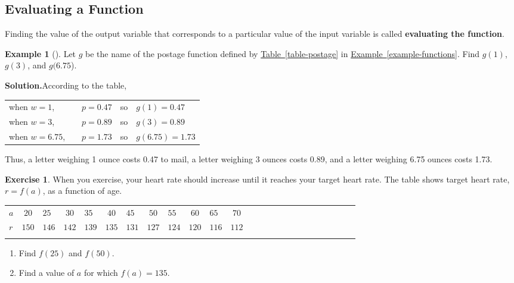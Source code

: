 \documentclass[10pt,]{book}
\newcommand{\terminology}[1]{\textbf{#1}}
\theoremstyle{plain}
\theoremstyle{definition}
\theoremstyle{definition}
\newtheorem{example}[theorem]{Example}
\theoremstyle{definition}
\theoremstyle{definition}
\newtheorem{exercise}[theorem]{Exercise}
\numberwithin{equation}{part}
\newcommand{\hrulethin}  {\noalign{\hrule height 0.04em}}
\newcommand{\hrulethick} {\noalign{\hrule height 0.11em}}
\begin{document}
\subsection[{Evaluating a Function}]{Evaluating a Function}\label{subsection-12}
Finding the value of the output variable that corresponds to a particular value of the input variable is called \terminology{evaluating the function}.%
\begin{example}[]\label{example-postage2}
Let \(g\) be the name of the postage function defined by \hyperref[table-postage]{Table~\ref{table-postage}}  in \hyperref[example-functions]{Example~\ref{example-functions}}. Find \(g(1)\), \(g(3)\), and \(g(6.75\)).%
\par\medskip\noindent%
\textbf{Solution.}\quad According to the table, \leavevmode%
\begin{table}
\centering
\begin{tabular}{lllll}
when \(w=1\),&&\(p=0.47\)&so&\(g(1)=0.47\)\tabularnewline[0pt]
when \(w=3\),&&\(p=0.89\)&so&\(g(3)=0.89\)\tabularnewline[0pt]
when \(w=6.75\),&&\(p=1.73\)&so&\(g(6.75)=1.73\)
\end{tabular}
\end{table}
 Thus, a letter weighing 1 ounce costs \textdollar{}0.47 to mail, a letter weighing 3 ounces costs \textdollar{}0.89, and a letter weighing 6.75 ounces costs \textdollar{}1.73.%
\end{example}
\begin{exercise}\label{exercise-heart-rate}
When you exercise, your heart rate should increase until it reaches your target heart rate. The table shows target heart rate, \(r = f(a)\), as a function of age. \begin{table}
\centering
\begin{tabular}{AcAcAcAcAcAcAcAcAcAcAcAcA}\hrulethick
\(a\)&\(20\)&\(25\)&\(30\)&\(35\)&\(40\)&\(45\)&\(50\)&\(55\)&\(60\)&\(65\)&\(70\)\tabularnewline\hrulethin
\(r\)&\(150\)&\(146\)&\(142\)&\(139\)&\(135\)&\(131\)&\(127\)&\(124\)&\(120\)&\(116\)&\(112\)\tabularnewline\hrulethin
\end{tabular}
\end{table}
\leavevmode%
\begin{enumerate}[label=\alph*]
\item\hypertarget{li-295}{}Find \(f(25)\) and \(f(50)\).%
\item\hypertarget{li-296}{}Find a value of \(a\) for which \(f(a) = 135\).%
\end{enumerate}
\end{exercise}
\end{document}

